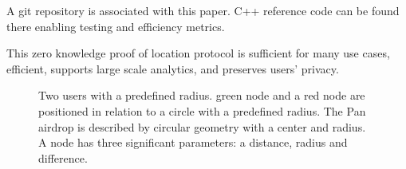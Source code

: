 \documentclass{article}
\begin{document}
A git repository is associated with this paper.
C++ reference code can be found there enabling testing and efficiency metrics. 

This zero knowledge proof of location protocol is sufficient for many use cases, efficient, supports large scale analytics, and preserves users' privacy.

\begin{figure}
  \centering
  \def\svgwidth{\columnwidth}
  
\caption{Two users with a predefined radius. green node and a red node are positioned in relation to a circle with a predefined radius. The Pan airdrop is described by circular geometry with a center and radius. A node has three significant parameters: a distance, radius and difference.}
\label{fig-rangeproof}
\end{figure}

\end{document}
